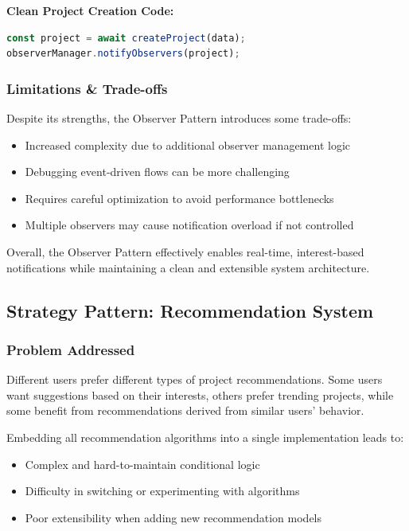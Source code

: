 \documentclass[a4paper,12pt]{report}
\begin{document}
\textbf{Clean Project Creation Code:}
\begin{lstlisting}[language=JavaScript, numbers=none]
const project = await createProject(data);
observerManager.notifyObservers(project);
\end{lstlisting}

\subsubsection{Limitations \& Trade-offs}
Despite its strengths, the Observer Pattern introduces some trade-offs:
\begin{itemize}
    \item Increased complexity due to additional observer management logic
    \item Debugging event-driven flows can be more challenging
    \item Requires careful optimization to avoid performance bottlenecks
    \item Multiple observers may cause notification overload if not controlled
\end{itemize}

Overall, the Observer Pattern effectively enables real-time, interest-based notifications while maintaining a clean and extensible system architecture.


\subsection{Strategy Pattern: Recommendation System}

\subsubsection{Problem Addressed}
Different users prefer different types of project recommendations. Some users want suggestions based on their interests, others prefer trending projects, while some benefit from recommendations derived from similar users’ behavior.

Embedding all recommendation algorithms into a single implementation leads to:
\begin{itemize}
    \item Complex and hard-to-maintain conditional logic
    \item Difficulty in switching or experimenting with algorithms
    \item Poor extensibility when adding new recommendation models
\end{itemize}
\end{document}
